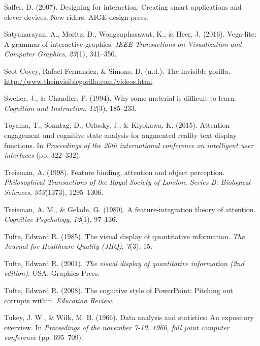 \documentclass[print]{nuthesis}
\newlength{\cslhangindent}
\newenvironment{CSLReferences}[2]%
{\setlength{\parindent}{0pt}%
\everypar{\setlength{\hangindent}{\cslhangindent}}\ignorespaces}%
{\par}
\begin{document}
\begin{CSLReferences}{1}{0}
\leavevmode{}%
Saffer, D. (2007). Designing for interaction: Creating smart applications and clever devices. New riders. AIGE design press.

\leavevmode{}%
Satyanarayan, A., Moritz, D., Wongsuphasawat, K., \& Heer, J. (2016). Vega-lite: A grammar of interactive graphics. \emph{IEEE Transactions on Visualization and Computer Graphics}, \emph{23}(1), 341--350.

\leavevmode{}%
Scot Covey, Rafael Fernandez, \& Simons, D. (n.d.). The invisible gorilla. \url{http://www.theinvisiblegorilla.com/videos.html}.

\leavevmode{}%
Sweller, J., \& Chandler, P. (1994). Why some material is difficult to learn. \emph{Cognition and Instruction}, \emph{12}(3), 185--233.

\leavevmode{}%
Toyama, T., Sonntag, D., Orlosky, J., \& Kiyokawa, K. (2015). Attention engagement and cognitive state analysis for augmented reality text display functions. In \emph{Proceedings of the 20th international conference on intelligent user interfaces} (pp. 322--332).

\leavevmode{}%
Treisman, A. (1998). Feature binding, attention and object perception. \emph{Philosophical Transactions of the Royal Society of London. Series B: Biological Sciences}, \emph{353}(1373), 1295--1306.

\leavevmode{}%
Treisman, A. M., \& Gelade, G. (1980). A feature-integration theory of attention. \emph{Cognitive Psychology}, \emph{12}(1), 97--136.

\leavevmode{}%
Tufte, Edward R. (1985). The visual display of quantitative information. \emph{The Journal for Healthcare Quality (JHQ)}, \emph{7}(3), 15.

\leavevmode{}%
Tufte, Edward R. (2001). \emph{The visual display of quantitative information (2nd edition)}. USA: Graphics Press.

\leavevmode{}%
Tufte, Edward R. (2008). The cognitive style of PowerPoint: Pitching out corrupts within. \emph{Education Review}.

\leavevmode{}%
Tukey, J. W., \& Wilk, M. B. (1966). Data analysis and statistics: An expository overview. In \emph{Proceedings of the november 7-10, 1966, fall joint computer conference} (pp. 695--709).


\end{CSLReferences}
\end{document}
